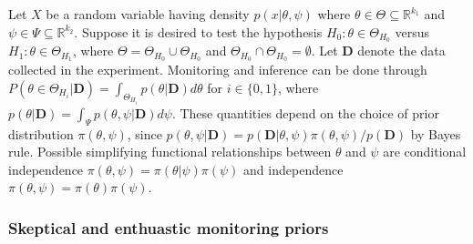 \documentclass[12pt]{article}
\begin{document}
Let $X$ be a random variable having density $p(x|\theta,\psi)$ where $\theta\in\Theta\subseteq\mathbb{R}^{k_1}$ and $\psi\in\Psi\subseteq\mathbb{R}^{k_2}$. Suppose it is desired to test the hypothesis $H_0:\theta\in\Theta_{H_0}$ versus $H_1:\theta\in\Theta_{H_1}$, where $\Theta=\Theta_{H_0}\cup \Theta_{H_0}$ and $\Theta_{H_0}\cap \Theta_{H_0}=\emptyset$. Let $\mathbf{D}$ denote the data collected in the experiment. Monitoring and inference can be done through $P(\theta\in\Theta_{H_i}|\mathbf{D})=\int_{\Theta_{H_i}}p(\theta|\mathbf{D})d\theta$ for $i\in\{0,1\}$, where $p(\theta|\mathbf{D})=\int_{\Psi}p(\theta,\psi|\mathbf{D})d\psi$. These quantities depend on the choice of prior distribution $\pi(\theta,\psi)$, since $p(\theta,\psi|\mathbf{D})=p(\mathbf{D}|\theta,\psi)\pi(\theta,\psi)/p(\mathbf{D})$ by Bayes rule. Possible simplifying functional relationships between $\theta$ and $\psi$ are conditional independence $\pi(\theta,\psi)=\pi(\theta|\psi)\pi(\psi)$ and independence $\pi(\theta,\psi)=\pi(\theta)\pi(\psi)$.%

\subsubsection{Skeptical and enthuastic monitoring priors}
\end{document}
